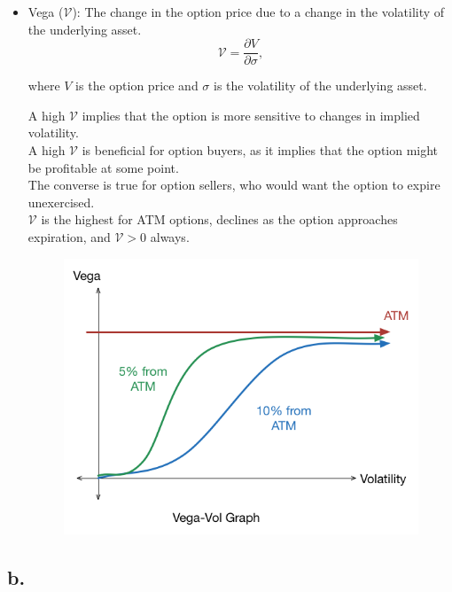 \documentclass{article}
\begin{document}
\begin{itemize}
    \item Vega ($\mathcal{V}$): The change in the option price due to a change in the volatility of the underlying asset.
          \begin{equation*}
              \mathcal{V} = \frac{\partial V}{\partial \sigma},
          \end{equation*}
          \begin{center}
              where $V$ is the option price and $\sigma$ is the volatility of the underlying asset.
          \end{center}
          A high $\mathcal{V}$ implies that the option is more sensitive to changes in implied volatility. \\
          A high $\mathcal{V}$ is beneficial for option buyers, as it implies that the option might be profitable at some point. \\
          The converse is true for option sellers, who would want the option to expire unexercised. \\
          $\mathcal{V}$ is the highest for ATM options, declines as the option approaches expiration, and $\mathcal{V} > 0$ always.
          \begin{figure}[H]
            \centering
            \includegraphics[scale=0.5]{Vega.png}
        \end{figure}
\end{itemize}


\subsection*{b.}
\end{document}
